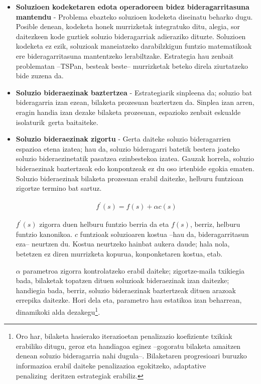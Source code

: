\documentclass[eu]{ifirak}\usepackage[]{graphicx}\usepackage[]{color}
\newcommand{\zkk}{\guillemotleft}
\newcommand{\skk}{\guillemotright}
\begin{document}
\begin{itemize}
\item \textbf{Soluzioen kodeketaren edota operadoreen bidez bideragarritasuna mantendu} - Problema ebazteko soluzioen kodeketa diseinatu beharko dugu. Posible denean, kodeketa honek murrizketak integratuko ditu, alegia, sor daitezkeen kode guztiek soluzio bideragarriak adieraziko dituzte. Soluzioen kodeketa ez ezik, soluzioak maneiatzeko darabilzkigun funtzio matematikoak ere bideragarritasuna mantentzeko lerabiltzake. Estrategia hau zenbait problematan --TSPan, besteak beste-- murrizketak beteko direla ziurtatzeko bide zuzena da.

\item \textbf{Soluzio bideraezinak baztertzea} - Estrategiarik sinpleena da; soluzio bat bideragarria izan ezean, bilaketa prozesuan baztertzen da. Sinplea izan arren, eragin handia izan dezake bilaketa prozesuan, espazioko zenbait eskualde \zkk isolaturik\skk\ gerta baitaiteke.

\item \textbf{Soluzio bideraezinak zigortu} - Gerta daiteke soluzio bideragarrien espazioa etena izatea; hau da, soluzio bideragarri batetik bestera joateko soluzio bideraezinetatik pasatzea ezinbestekoa izatea. Gauzak horrela, soluzio bideraezinak baztertzeak edo konpontzeak ez du oso irtenbide egokia ematen. Soluzio bideraezinak bilaketa prozesuan erabil daitezke, helburu funtzioan zigortze termino bat sartuz. 

\begin{align*}
f^\prime(s) = f(s) + \alpha c(s) 
\end{align*} 

$f^\prime(s)$ zigorra duen helburu funtzio berria da eta $f(s)$, berriz, helburu funtzio \zkk kanonikoa\skk. $c$ funtzioak soluzioaren kostua --hau da, bideragarritasun eza-- neurtzen du. Kostua neurtzeko hainbat aukera daude; hala nola, betetzen ez diren murrizketa kopurua, konponketaren kostua, etab. 

$\alpha$ parametroa zigorra kontrolatzeko erabil daiteke; zigortze-maila txikiegia bada, bilaketak topatzen dituen soluzioak bideraezinak izan daitezke; handiegia bada, berriz, soluzio bideraezinak baztertzeak dituen arazoak errepika daitezke. Hori dela eta, parametro hau estatikoa izan beharrean, dinamikoki alda dezakegu\footnote{Oro har, bilaketa hasierako iterazioetan penalizazio koefiziente txikiak erabiliko ditugu, geroz eta handiagoa eginez --gogoratu bilaketa amaitzen denean soluzio bideragarria nahi dugula--. Bilaketaren progresioari buruzko informazioa erabil daiteke penalizazioa egokitzeko, \zkk adaptative penalizing\skk\ deritzen estrategiak erabiliz.}.


\end{itemize}
\end{document}
